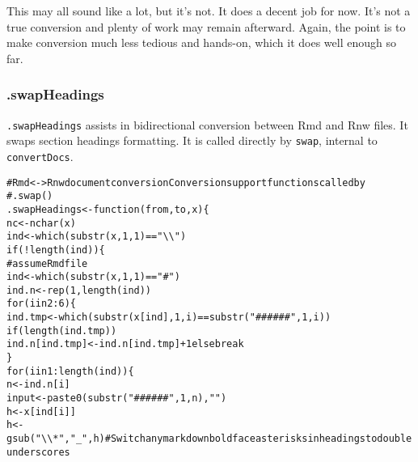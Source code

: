 \documentclass{article}\usepackage[]{graphicx}\usepackage[]{color}
\makeatletter
\newcommand{\hlnum}[1]{\textcolor[rgb]{0.863,0.196,0.184}{#1}}%
\newcommand{\hlstr}[1]{\textcolor[rgb]{0.863,0.196,0.184}{#1}}%
\newcommand{\hlcom}[1]{\textcolor[rgb]{0.345,0.431,0.459}{#1}}%
\newcommand{\hlopt}[1]{\textcolor[rgb]{0.576,0.631,0.631}{#1}}%
\newcommand{\hlstd}[1]{\textcolor[rgb]{0.514,0.58,0.588}{#1}}%
\newcommand{\hlkwa}[1]{\textcolor[rgb]{0.796,0.294,0.086}{#1}}%
\newcommand{\hlkwb}[1]{\textcolor[rgb]{0.522,0.6,0}{#1}}%
\newcommand{\hlkwc}[1]{\textcolor[rgb]{0.796,0.294,0.086}{#1}}%
\newcommand{\hlkwd}[1]{\textcolor[rgb]{0.576,0.631,0.631}{#1}}%
\newenvironment{kframe}{%
 \def\at@end@of@kframe{}%
 \ifinner\ifhmode%
  \def\at@end@of@kframe{\end{minipage}}%
  \begin{minipage}{\columnwidth}%
 \fi\fi%
 \def\FrameCommand##1{\hskip\@totalleftmargin \hskip-\fboxsep
 \colorbox{shadecolor}{##1}\hskip-\fboxsep
     \hskip-\linewidth \hskip-\@totalleftmargin \hskip\columnwidth}%
 \MakeFramed {\advance\hsize-\width
   \@totalleftmargin\z@ \linewidth\hsize
   \@setminipage}}%
 {\par\unskip\endMakeFramed%
 \at@end@of@kframe}
\newenvironment{knitrout}{}{} %
\makeatother
\begin{document}
This may all sound like a lot, but it's not. It does a decent job for now.
It's not a true conversion and plenty of work may remain afterward.
Again, the point is to make conversion much less tedious and hands-on, which it does well enough so far.

\subsubsection{.swapHeadings}
\texttt{.swapHeadings} assists in bidirectional conversion between Rmd and Rnw files.
It swaps section headings formatting.
It is called directly by \texttt{swap}, internal to \texttt{convertDocs}.


\begin{knitrout}
\color{fgcolor}\begin{kframe}
\begin{alltt}
\hlcom{# Rmd <-> Rnw document conversion Conversion support functions called by}
\hlcom{# .swap()}
\hlstd{.swapHeadings} \hlkwb{<-} \hlkwa{function}\hlstd{(}\hlkwc{from}\hlstd{,} \hlkwc{to}\hlstd{,} \hlkwc{x}\hlstd{) \{}
    \hlstd{nc} \hlkwb{<-} \hlkwd{nchar}\hlstd{(x)}
    \hlstd{ind} \hlkwb{<-} \hlkwd{which}\hlstd{(}\hlkwd{substr}\hlstd{(x,} \hlnum{1}\hlstd{,} \hlnum{1}\hlstd{)} \hlopt{==} \hlstr{"\textbackslash{}\textbackslash{}"}\hlstd{)}
    \hlkwa{if} \hlstd{(}\hlopt{!}\hlkwd{length}\hlstd{(ind)) \{}
        \hlcom{# assume Rmd file}
        \hlstd{ind} \hlkwb{<-} \hlkwd{which}\hlstd{(}\hlkwd{substr}\hlstd{(x,} \hlnum{1}\hlstd{,} \hlnum{1}\hlstd{)} \hlopt{==} \hlstr{"#"}\hlstd{)}
        \hlstd{ind.n} \hlkwb{<-} \hlkwd{rep}\hlstd{(}\hlnum{1}\hlstd{,} \hlkwd{length}\hlstd{(ind))}
        \hlkwa{for} \hlstd{(i} \hlkwa{in} \hlnum{2}\hlopt{:}\hlnum{6}\hlstd{) \{}
            \hlstd{ind.tmp} \hlkwb{<-} \hlkwd{which}\hlstd{(}\hlkwd{substr}\hlstd{(x[ind],} \hlnum{1}\hlstd{, i)} \hlopt{==} \hlkwd{substr}\hlstd{(}\hlstr{"######"}\hlstd{,} \hlnum{1}\hlstd{, i))}
            \hlkwa{if} \hlstd{(}\hlkwd{length}\hlstd{(ind.tmp))}
                \hlstd{ind.n[ind.tmp]} \hlkwb{<-} \hlstd{ind.n[ind.tmp]} \hlopt{+} \hlnum{1} \hlkwa{else break}
        \hlstd{\}}
        \hlkwa{for} \hlstd{(i} \hlkwa{in} \hlnum{1}\hlopt{:}\hlkwd{length}\hlstd{(ind)) \{}
            \hlstd{n} \hlkwb{<-} \hlstd{ind.n[i]}
            \hlstd{input} \hlkwb{<-} \hlkwd{paste0}\hlstd{(}\hlkwd{substr}\hlstd{(}\hlstr{"######"}\hlstd{,} \hlnum{1}\hlstd{, n),} \hlstr{" "}\hlstd{)}
            \hlstd{h} \hlkwb{<-} \hlstd{x[ind[i]]}
            \hlstd{h} \hlkwb{<-} \hlkwd{gsub}\hlstd{(}\hlstr{"\textbackslash{}\textbackslash{}*"}\hlstd{,} \hlstr{"_"}\hlstd{, h)}  \hlcom{# Switch any markdown boldface asterisks in headings to double underscores}

\end{alltt}
\end{kframe}
\end{knitrout}
\end{document}
